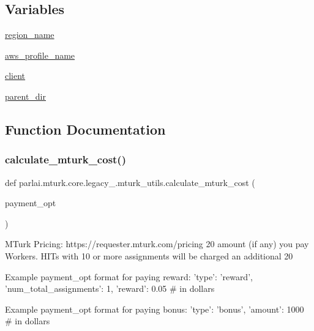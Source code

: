 \subsection*{Variables}
\begin{DoxyCompactItemize}
\item 
\hyperlink{namespaceparlai_1_1mturk_1_1core_1_1legacy__2018_1_1mturk__utils_ab49b9cdcc363c0dccb916988546171ed}{region\+\_\+name}
\item 
\hyperlink{namespaceparlai_1_1mturk_1_1core_1_1legacy__2018_1_1mturk__utils_ad7c6bfcd8f9679dbed0eebe64230458e}{aws\+\_\+profile\+\_\+name}
\item 
\hyperlink{namespaceparlai_1_1mturk_1_1core_1_1legacy__2018_1_1mturk__utils_a35eea1b231a5600c0a82176fd2a023a0}{client}
\item 
\hyperlink{namespaceparlai_1_1mturk_1_1core_1_1legacy__2018_1_1mturk__utils_a90c8f0752571a5e4decf9077aab60c8b}{parent\+\_\+dir}
\end{DoxyCompactItemize}


\subsection{Function Documentation}
\mbox{\label{namespaceparlai_1_1mturk_1_1core_1_1legacy__2018_1_1mturk__utils_a2c1cd16e531345372d5ec5c858bd74f2}} 
\subsubsection{\texorpdfstring{calculate\+\_\+mturk\+\_\+cost()}{calculate\_mturk\_cost()}}
{\footnotesize\ttfamily def parlai.\+mturk.\+core.\+legacy\+\_.\+mturk\+\_\+utils.\+calculate\+\_\+mturk\+\_\+cost (\begin{DoxyParamCaption}\item[{}]{payment\+\_\+opt }\end{DoxyParamCaption})}

\begin{DoxyVerb}MTurk Pricing: https://requester.mturk.com/pricing 20%
amount (if any) you pay Workers. HITs with 10 or more assignments will be charged an
additional 20%

Example payment_opt format for paying reward:
{
    'type': 'reward',
    'num_total_assignments': 1,
    'reward': 0.05  # in dollars
}

Example payment_opt format for paying bonus:
{
    'type': 'bonus',
    'amount': 1000  # in dollars
}
\end{DoxyVerb}
 

